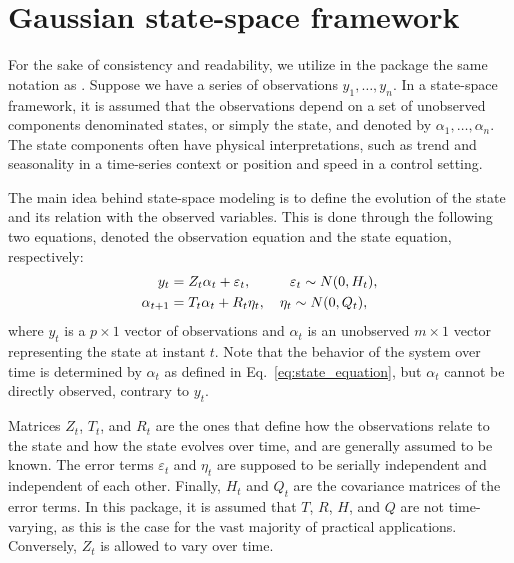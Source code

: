 \documentclass{juliacon}
\begin{document}
\section{Gaussian state-space framework} \label{sec:statespace}

For the sake of consistency and readability, we utilize in the package the same notation as \cite{durbin2012time}. Suppose we have a series of observations $y_{1}, \dots, y_{n}$. In a state-space framework, it is assumed that the observations depend on a set of unobserved components denominated states, or simply the state, and denoted by $\alpha_{1}, \dots, \alpha_{n}$. The state components often have physical interpretations, such as trend and seasonality in a time-series context or position and speed in a control setting.

The main idea behind state-space modeling is to define the evolution of the state and its relation with the observed variables. This is done through the following two equations, denoted the observation equation and the state equation, respectively:
%
\begin{align}
    y_{t} &= Z_{t} \alpha_{t} + \varepsilon_{t}, \hspace{0.08\columnwidth} \varepsilon_{t} \sim N(0, H_{t}), \label{eq:obs_equation} \\
    \alpha_{t+1} &= T_{t} \alpha_{t} + R_{t} \eta_{t}, \quad \eta_{t} \sim N(0, Q_{t}), \label{eq:state_equation}
\end{align}
%
\noindent where $y_{t}$ is a $p \times 1$ vector of observations and $\alpha_{t}$ is an unobserved $m \times 1$ vector representing the state at instant $t$. Note that the behavior of the system over time is determined by $\alpha_{t}$ as defined in \mbox{Eq. \eqref{eq:state_equation}}, but $\alpha_{t}$ cannot be directly observed, contrary to $y_{t}$.

Matrices $Z_{t}$, $T_{t}$, and $R_{t}$ are the ones that define how the observations relate to the state and how the state evolves over time, and are generally assumed to be known. The error terms $\varepsilon_{t}$ and $\eta_{t}$ are supposed to be serially independent and independent of each other. Finally, $H_{t}$ and $Q_{t}$ are the covariance matrices of the error terms. In this package, it is assumed that $T$, $R$, $H$, and $Q$ are not time-varying, as this is the case for the vast majority of practical applications. Conversely, $Z_{t}$ is allowed to vary over time.
\end{document}

